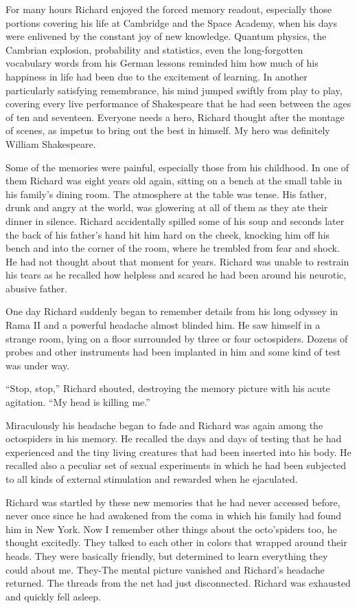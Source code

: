 \documentclass[]{article}
\begin{document}
{{For many hours Richard enjoyed the forced memory readout, especially those portions covering his life at Cambridge and the Space Academy, when his days were enlivened by the constant joy of new knowledge.  Quantum physics, the Cambrian explosion, probability and statistics, even the long-forgotten vocabulary words from his German lessons reminded him how much of his happiness in life had been due to the excitement of learning.  In another particularly satisfying remembrance, his mind jumped swiftly from play to play, covering every live performance of Shakespeare that he had seen between the ages of ten and seventeen.  Everyone needs a hero, Richard thought after the montage of scenes, as impetus to bring out the best in himself.  My hero was definitely William Shakespeare.

Some of the memories were painful, especially those from his childhood.  In one of them Richard was eight years old again, sitting on a bench at the small table in his family’s dining room.  The atmosphere at the table was tense.  His father, drunk and angry at the world, was glowering at all of them as they ate their dinner in silence.  Richard accidentally spilled some of his soup and seconds later the back of his father’s hand hit him hard on the cheek, knocking him off his bench and into the corner of the room, where he trembled from fear and shock.  He had not thought about that moment for years.  Richard was unable to restrain his tears as he recalled how helpless and scared he had been around his neurotic, abusive father.

One day Richard suddenly began to remember details from his long odyssey in Rama II and a powerful headache almost blinded him.  He saw himself in a strange room, lying on a floor surrounded by three or four octospiders.  Dozens of probes and other instruments had been implanted in him and some kind of test was under way.

“Stop, stop,” Richard shouted, destroying the memory picture with his acute agitation.  “My head is killing me.”

Miraculously his headache began to fade and Richard was again among the octospiders in his memory.  He recalled the days and days of testing that he had experienced and the tiny living creatures that had been inserted into his body.  He recalled also a peculiar set of sexual experiments in which he had been subjected to all kinds of external stimulation and rewarded when he ejaculated.

Richard was startled by these new memories that he had never accessed before, never once since he had awakened from the coma in which his family had found him in New York.  Now I remember other things about the octo’spiders too, he thought excitedly.  They talked to each other in colors that wrapped around their heads.  They were basically friendly, but determined to learn everything they could about me.  They-The mental picture vanished and Richard’s headache returned.  The threads from the net had just disconnected.  Richard was exhausted and quickly fell asleep.

}}
\end{document}
